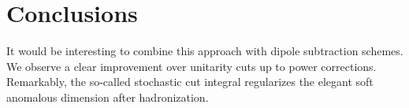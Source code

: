 \section{Conclusions}\label{sec:conclusions}

It would be interesting to combine this approach with dipole subtraction
schemes. We observe a clear improvement over unitarity cuts up to power
corrections. Remarkably, the so-called stochastic cut integral
regularizes the elegant soft anomalous dimension after hadronization.

